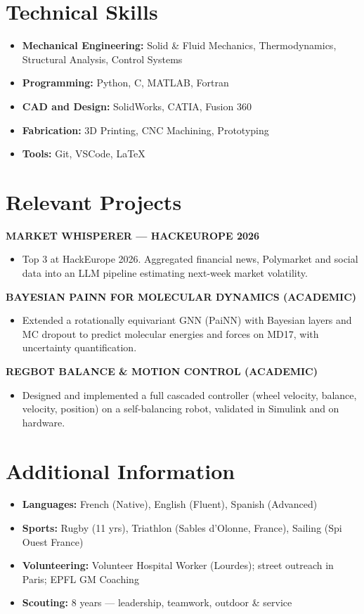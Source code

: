 \documentclass[10pt]{article}
\newcommand{\resumesection}[1]{\section{#1}\vspace{-0.6em}}
\newcommand{\company}[2]{\noindent\textbf{\uppercase{#1}}\hfill \textbf{#2}}
\begin{document}
\resumesection{Technical Skills}
\begin{itemize}[leftmargin=*,nosep,label={\scriptsize\textbullet},itemsep=0.15em]
    \item \textbf{Mechanical Engineering:} Solid \& Fluid Mechanics, Thermodynamics, Structural Analysis, Control Systems
    \item \textbf{Programming:} Python, C, MATLAB, Fortran
    \item \textbf{CAD and Design:} SolidWorks, CATIA, Fusion 360
    \item \textbf{Fabrication:} 3D Printing, CNC Machining, Prototyping
    \item \textbf{Tools:} Git, VSCode, LaTeX
\end{itemize}


\resumesection{Relevant Projects}
\company{Market Whisperer --- HackEurope 2026}{}
\begin{itemize}[leftmargin=*,nosep,label={\scriptsize\textbullet}]
    \item Top 3 at HackEurope 2026. Aggregated financial news, Polymarket and social data into an LLM pipeline estimating next-week market volatility.
\end{itemize}

\company{Bayesian PaiNN for Molecular Dynamics (academic)}{}
\begin{itemize}[leftmargin=*,nosep,label={\scriptsize\textbullet}]
    \item Extended a rotationally equivariant GNN (PaiNN) with Bayesian layers and MC dropout to predict molecular energies and forces on MD17, with uncertainty quantification.
\end{itemize}

\company{REGBOT Balance \& Motion Control (academic)}{}
\begin{itemize}[leftmargin=*,nosep,label={\scriptsize\textbullet}]
    \item Designed and implemented a full cascaded controller (wheel velocity, balance, velocity, position) on a self-balancing robot, validated in Simulink and on hardware.
\end{itemize}


\resumesection{Additional Information}
\begin{itemize}[leftmargin=*,nosep,label={\scriptsize\textbullet},itemsep=0.15em]
    \item \textbf{Languages:} French (Native), English (Fluent), Spanish (Advanced)
    \item \textbf{Sports:} Rugby (11 yrs), Triathlon (Sables d’Olonne, France), Sailing (Spi Ouest France)
    \item \textbf{Volunteering:} Volunteer Hospital Worker (Lourdes); street outreach in Paris; EPFL GM Coaching
    \item \textbf{Scouting:} 8 years --- leadership, teamwork, outdoor \& service
\end{itemize}
\end{document}
